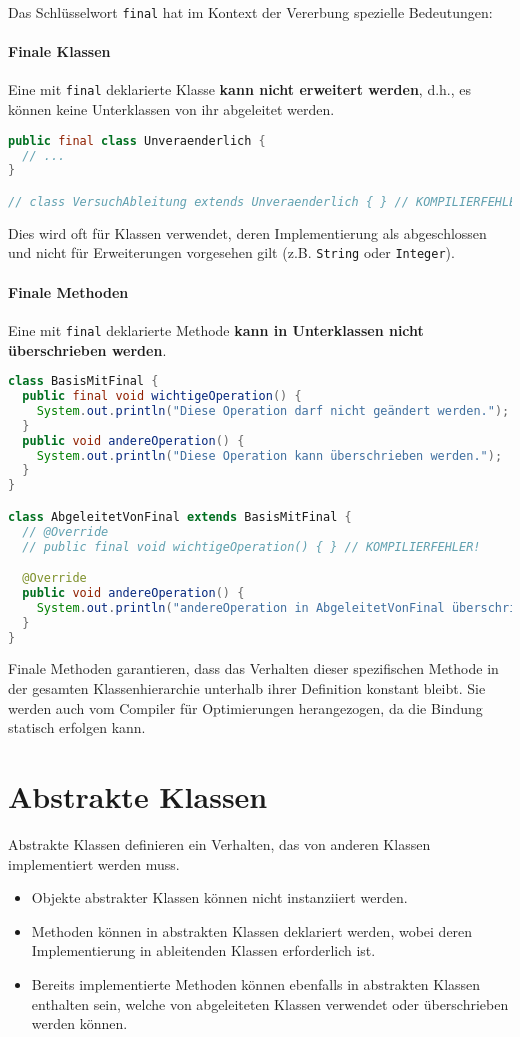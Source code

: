 Das Schlüsselwort \texttt{final} hat im Kontext der Vererbung spezielle
Bedeutungen:

\paragraph{Finale Klassen}
Eine mit \texttt{final} deklarierte Klasse \textbf{kann nicht erweitert
  werden}, d.h., es können keine Unterklassen von ihr abgeleitet werden.
\begin{lstlisting}[language=Java, caption={\texttt{final} Klasse}]
public final class Unveraenderlich {
  // ...
}

// class VersuchAbleitung extends Unveraenderlich { } // KOMPILIERFEHLER!
\end{lstlisting}
Dies wird oft für Klassen verwendet, deren Implementierung als abgeschlossen
und nicht für Erweiterungen vorgesehen gilt (z.B. \texttt{String} oder
\texttt{Integer}).

\paragraph{Finale Methoden}
Eine mit \texttt{final} deklarierte Methode \textbf{kann in Unterklassen nicht
  überschrieben werden}.
\begin{lstlisting}[language=Java, caption={\texttt{final} Methode}]
class BasisMitFinal {
  public final void wichtigeOperation() {
    System.out.println("Diese Operation darf nicht geändert werden.");
  }
  public void andereOperation() {
    System.out.println("Diese Operation kann überschrieben werden.");
  }
}

class AbgeleitetVonFinal extends BasisMitFinal {
  // @Override
  // public final void wichtigeOperation() { } // KOMPILIERFEHLER!

  @Override
  public void andereOperation() {
    System.out.println("andereOperation in AbgeleitetVonFinal überschrieben.");
  }
}
\end{lstlisting}
Finale Methoden garantieren, dass das Verhalten dieser spezifischen Methode in
der gesamten Klassenhierarchie unterhalb ihrer Definition konstant bleibt. Sie
werden auch vom Compiler für Optimierungen herangezogen, da die Bindung
statisch erfolgen kann.

\section{Abstrakte Klassen}

Abstrakte Klassen definieren ein Verhalten, das von anderen Klassen
implementiert werden muss.
\begin{itemize}
  \item Objekte abstrakter Klassen können nicht instanziiert werden.
  \item Methoden können in abstrakten Klassen deklariert werden, wobei deren
        Implementierung in ableitenden Klassen erforderlich ist.
  \item Bereits implementierte Methoden können ebenfalls in abstrakten Klassen
        enthalten sein, welche von abgeleiteten Klassen verwendet oder überschrieben
        werden können.
\end{itemize}